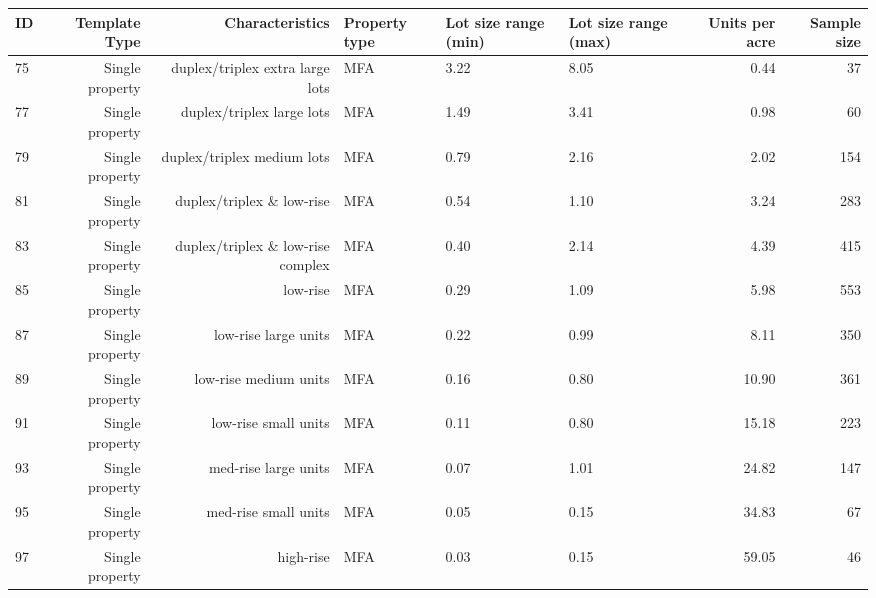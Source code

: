 \begin{tabular}{ p{0.5in} r r p{1in} p{0.75in} p{0.75in} rr}

ID & Template Type & Characteristics & Property type & Lot size range (min) & Lot size range (max) & Units per acre & Sample size \\
\hline
        75 & Single property & duplex/triplex extra large lots & MFA &       3.22 &       8.05 &       0.44 &         37 \\

        77 & Single property & duplex/triplex large lots & MFA &       1.49 &       3.41 &       0.98 &         60 \\

        79 & Single property & duplex/triplex medium lots & MFA &       0.79 &       2.16 &       2.02 &        154 \\

        81 & Single property & duplex/triplex \& low-rise & MFA &       0.54 &       1.10 &       3.24 &        283 \\

        83 & Single property & duplex/triplex \& low-rise complex & MFA &       0.40 &       2.14 &       4.39 &        415 \\

        85 & Single property &   low-rise & MFA &       0.29 &       1.09 &       5.98 &        553 \\

        87 & Single property & low-rise large units & MFA &       0.22 &       0.99 &       8.11 &        350 \\

        89 & Single property & low-rise medium units & MFA &       0.16 &       0.80 &      10.90 &        361 \\

        91 & Single property & low-rise small units & MFA &       0.11 &       0.80 &      15.18 &        223 \\

        93 & Single property & med-rise large units & MFA &       0.07 &       1.01 &      24.82 &        147 \\

        95 & Single property & med-rise small units & MFA &       0.05 &       0.15 &      34.83 &         67 \\

        97 & Single property &  high-rise & MFA &       0.03 &       0.15 &      59.05 &         46 \\
\hline

\end{tabular}  

